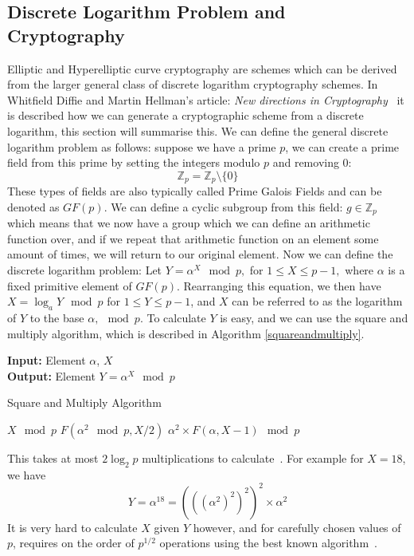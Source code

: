 \subsection{Discrete Logarithm Problem and Cryptography}
Elliptic and Hyperelliptic curve cryptography are schemes which can be derived from the larger general class of discrete logarithm cryptography schemes. In Whitfield Diffie and Martin Hellman's article: \emph{New directions in Cryptography}~\cite{Diffie:2006:NDC:2263321.2269104} it is described how we can generate a cryptographic scheme from a discrete logarithm, this section will summarise this. We can define the general discrete logarithm problem as follows: suppose we have a prime $p$, we can create a prime field from this prime by setting the integers modulo $p$ and removing 0: $$\mathbb{Z}_p = \mathbb{Z}_p \setminus \{0\}$$ These types of fields are also typically called Prime Galois Fields and can be denoted as $GF(p)$. We can define a cyclic subgroup from this field: $g \in \mathbb{Z}_p$ which means that we now have a group which we can define an arithmetic function over, and if we repeat that arithmetic function on an element some amount of times, we will return to our original element. Now we can define the discrete logarithm problem: Let $Y = \alpha^X\mod{p},$ for $1 \leq X \leq p-1,$ where $\alpha$ is a fixed primitive element of $GF(p)$. Rearranging this equation, we then have $X = \log_aY\mod{p}$ for $1 \leq Y \leq p-1$, and $X$ can be referred to as the logarithm of $Y$ to the base $\alpha,\mod{p}.$ To calculate $Y$ is easy, and we can use the square and multiply algorithm, which is described in Algorithm \ref{squareandmultiply}.
\begin{algorithm}[!htb]
\textbf{Input:} Element $\alpha$, $X$ \\
\textbf{Output:} Element $Y = \alpha^X\mod p$ 
\caption{Square and Multiply Algorithm}\label{squareandmultiply}
\algrule
\begin{algorithmic}[1]
\Return $X \mod{p}$
\Return $F(\alpha^2\mod{p}, X/2)$ 
\Return $\alpha^2 \times F(\alpha, X-1) \mod{p}$
\EndIf
\EndFunction
\end{algorithmic}
\end{algorithm}
This takes at most $2\log_2p$ multiplications to calculate~\cite{10007220734}. For example for $X = 18$, we have $$Y = \alpha^{18} = (((\alpha^2)^2)^2)^2 \times \alpha^2$$ It is very hard to calculate $X$ given $Y$ however, and for carefully chosen values of $p$, requires on the order of $p^{1/2}$ operations using the best known algorithm~\cite{mcclellan1974art}. 
